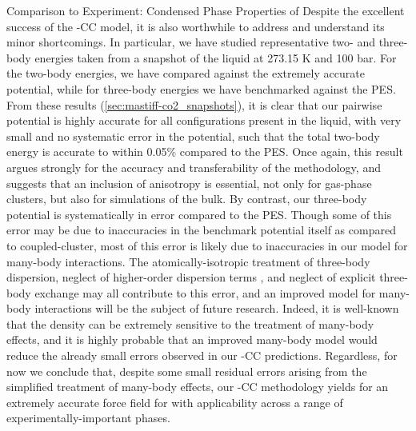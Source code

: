 \begin{subsection}{Comparison to Experiment: Condensed Phase Properties of \co}
Despite the excellent success of the \mastiff-CC model, it is also worthwhile to
address and understand its minor shortcomings. In particular, we have studied 
representative two- and three-body energies taken from a snapshot of
the liquid at 273.15 K and 100 bar. For the two-body energies, we have compared
against the extremely accurate  potential, while for
three-body energies we have benchmarked against the 
PES. From these results (\cref{sec:mastiff-co2_snapshots}), 
it is clear that our pairwise
\mastiff potential is highly accurate for all configurations present in the
liquid, with very small \rmse and no systematic error in the
potential, such that the total two-body energy is accurate to within 0.05\%
compared to the \citeauthor{Kalugina2014} PES. Once again, this result argues
strongly for the accuracy and transferability of the \mastiff methodology, and
suggests that an inclusion of anisotropy is essential, not only for gas-phase
clusters, but also for simulations of the bulk. By contrast, our three-body
potential is systematically in error compared to the \citeauthor{Hellmann2017}
PES. Though some of this error may be due to inaccuracies in the
benchmark potential itself as compared to coupled-cluster,\cite{Hellmann2017}
most of this error is likely due to
inaccuracies in our model for many-body \co interactions. The
atomically-isotropic treatment of three-body dispersion, neglect of
higher-order dispersion terms ,
and neglect of explicit three-body exchange
may all contribute to this error, and
an improved model for many-body \co interactions will be the subject of future
research. Indeed, it is well-known that the density can be extremely sensitive
to the treatment of many-body effects,\cite{Desgranges2015} and it is highly
probable that an improved many-body model would reduce the already small
errors observed in our \mastiff-CC predictions.
Regardless, for now we conclude that, despite some small residual errors
arising from the simplified treatment of many-body effects, our \mastiff-CC
methodology yields for an extremely accurate force field for \co with
applicability across 
a range of experimentally-important phases.



\begin{table}
\centering
\renewcommand\arraystretch{1.1}
\begin{tabular}{@{}lccccc@{}}
\hline
\toprule


\end{tabular}
\end{table}
\end{subsection}
